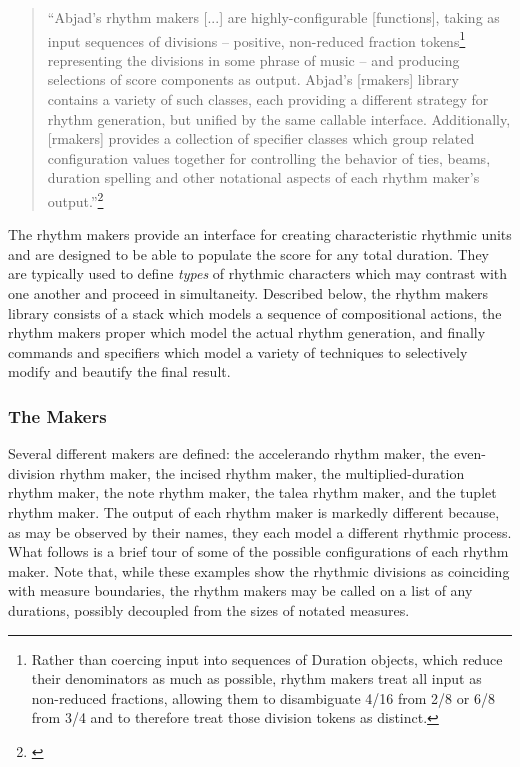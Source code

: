 \begin{quote}
\singlespacing
``Abjad’s rhythm makers [...] are highly-configurable [functions], taking as input sequences of divisions -- positive, non-reduced fraction tokens\footnote{Rather than coercing input into sequences of Duration objects, which reduce their denominators as much as possible, rhythm makers treat all input as non-reduced fractions, allowing them to disambiguate {4/16} from {2/8} or {6/8} from {3/4} and to therefore treat those division tokens as distinct.} representing the divisions in some phrase of music -- and producing selections of score components as output. Abjad’s [rmakers] library contains a variety of such classes, each providing a different strategy for rhythm generation, but unified by the same callable interface. Additionally, [rmakers] provides a collection of specifier classes which group related configuration values together for controlling the behavior of ties, beams, duration spelling and other notational aspects of each rhythm maker’s output.''\footnote{\citet[p.118]{josiahpaper}}
\end{quote}

The rhythm makers provide an interface for creating characteristic rhythmic units and are designed to be able to populate the score for any total duration. They are typically used to define \textit{types} of rhythmic characters which may contrast with one another and proceed in simultaneity. Described below, the rhythm makers library consists of a stack which models a sequence of compositional actions, the rhythm makers proper which model the actual rhythm generation, and finally commands and specifiers which model a variety of techniques to selectively modify and beautify the final result.

\subsubsection{The Makers}

Several different makers are defined: the accelerando rhythm maker, the even-division rhythm maker, the incised rhythm maker, the multiplied-duration rhythm maker, the note rhythm maker, the talea rhythm maker, and the tuplet rhythm maker. The output of each rhythm maker is markedly different because, as may be observed by their names, they each model a different rhythmic process. What follows is a brief tour of some of the possible configurations of each rhythm maker. Note that, while these examples show the rhythmic divisions as coinciding with measure boundaries, the rhythm makers may be called on a list of any durations, possibly decoupled from the sizes of notated measures.

